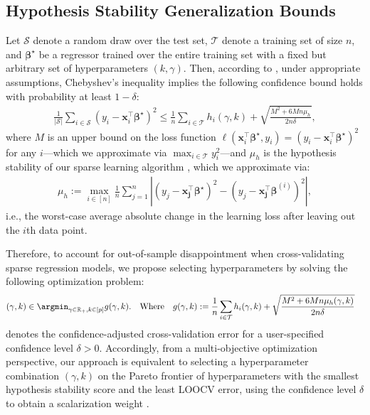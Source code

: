 \documentclass[opre,nonblindrev]{informs3} %
\begin{document}
\subsection{Hypothesis Stability Generalization Bounds}\label{ssec:testsetbounds}
Let $\mathcal{S}$ denote a random draw over the test set, $\mathcal{T}$ denote a training set of size $n$, and $\bm{\beta}^\star$ be a regressor trained over the entire training set with a fixed but arbitrary set of hyperparameters $(k, \gamma)$. Then, according to \citet[Theorem 11]{bousquet2002stability}, {under appropriate assumptions,} Chebyshev's inequality implies the following confidence bound holds with probability at least $1-\delta$:
\begin{align}\label{l10ucb}
	\frac{1}{\vert \mathcal{S}\vert} \sum_{i \in \mathcal{S}} (y_i-\bm{x}_i^\top \bm{\beta}^\star)^2 \leq \frac{1}{n} \sum_{i \in \mathcal{T}} h_i(\gamma, k)+\sqrt{\frac{M^2+6 M n \mu_h}{2 n \delta}},
\end{align}
where $M$ is an upper bound on the loss function $\ell(\bm{x}_i^\top \bm{\beta}^\star, y_i)=(y_i-\bm{x}_i^\top \bm{\beta}^\star)^2$ for any $i$—which we approximate via $\max_{i \in \mathcal{T}} y_i^2$—and $\mu_h$ is the hypothesis stability of our sparse learning algorithm \citep[][Definition 3]{bousquet2002stability}, which we approximate via:
\begin{align}\label{eq:hypothesisStability}
	\mu_h:=\max_{i\in [n]}\frac{1}{n}\sum_{j=1}^n \left\vert (y_j-\bm{x_j^\top\bm{\beta}^\star} )^2-(y_j-\bm{x_j^\top \beta}^{(i)} )^2\right\vert,
\end{align}
i.e., the worst-case average absolute change in the learning loss after leaving out the $i$th data point.%

Therefore, to account for out-of-sample disappointment when cross-validating sparse regression models, we propose selecting hyperparameters by solving the following optimization problem:
\begin{align}\label{eq:param_opt}&(\gamma,k)\in \argmin_{\gamma\in \mathbb{R}_+,k\in [p]} g(\gamma,k).\quad \text{Where}\quad g(\gamma, k):= \frac{1}{n} \sum_{i \in \mathcal{T}} h_i(\gamma, k)+\sqrt{\frac{M^2+6 M n \mu_h(\gamma, k)}{2 n \delta}}
\end{align}
denotes the confidence-adjusted cross-validation error for a user-specified confidence level $\delta >0$. Accordingly, from a multi-objective optimization perspective, our approach is equivalent to selecting a hyperparameter combination $(\gamma, k)$ on the Pareto frontier of hyperparameters with the smallest hypothesis stability score and the least LOOCV error, using the confidence level $\delta$ to obtain a scalarization weight \citep[see also][for a general theory of multi-objective optimization]{ehrgott2005multicriteria}. 
\end{document}
